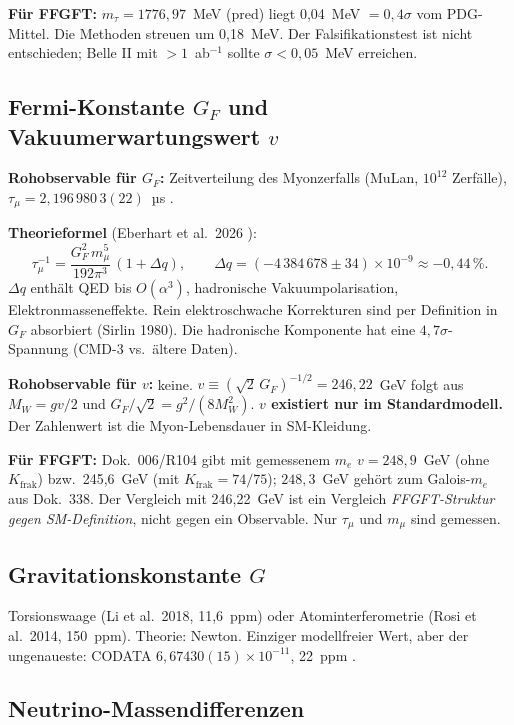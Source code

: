 \textbf{Für FFGFT:} $m_\tau=1776{,}97$~MeV (pred) liegt 0{,}04~MeV $=0{,}4\sigma$ vom PDG-Mittel. Die Methoden streuen um 0{,}18~MeV. Der Falsifikationstest ist nicht entschieden; Belle II mit $>1$~ab$^{-1}$ sollte $\sigma<0{,}05$~MeV erreichen.

\subsection{Fermi-Konstante $G_F$ und Vakuumerwartungswert $v$}

\textbf{Rohobservable für $G_F$:} Zeitverteilung des Myonzerfalls (MuLan, $10^{12}$ Zerfälle), $\tau_\mu=2{,}196\,980\,3(22)$~µs \QM.

\textbf{Theorieformel} (Eberhart et al.\ 2026 \QM):
\begin{equation}
\tau_\mu^{-1}=\frac{G_F^2\,m_\mu^5}{192\pi^3}\,(1+\Delta q),\qquad \Delta q=(-4\,384\,678\pm34)\times10^{-9}\approx-0{,}44\,\%.
\end{equation}
$\Delta q$ enthält QED bis $O(\alpha^3)$, hadronische Vakuumpolarisation, Elektronmasseneffekte. Rein elektroschwache Korrekturen sind per Definition in $G_F$ absorbiert (Sirlin 1980). Die hadronische Komponente hat eine $4{,}7\sigma$-Spannung (CMD-3 vs.\ ältere Daten).

\textbf{Rohobservable für $v$:} keine. $v\equiv(\sqrt2\,G_F)^{-1/2}=246{,}22$~GeV folgt aus $M_W=gv/2$ und $G_F/\sqrt2=g^2/(8M_W^2)$. \textbf{$v$ existiert nur im Standardmodell.} Der Zahlenwert ist die Myon-Lebensdauer in SM-Kleidung.

\textbf{Für FFGFT:} Dok.~006/R104 gibt mit gemessenem $m_e$ $v=248{,}9$~GeV (ohne $K_\text{frak}$) bzw.\ 245{,}6~GeV (mit $K_\text{frak}=74/75$); $248{,}3$~GeV gehört zum Galois-$m_e$ aus Dok.~338. Der Vergleich mit 246{,}22~GeV ist ein Vergleich \emph{FFGFT-Struktur gegen SM-Definition}, nicht gegen ein Observable. Nur $\tau_\mu$ und $m_\mu$ sind gemessen.

\subsection{Gravitationskonstante $G$}

Torsionswaage (Li et al.\ 2018, 11{,}6~ppm) oder Atominterferometrie (Rosi et al.\ 2014, 150~ppm). Theorie: Newton. Einziger modellfreier Wert, aber der ungenaueste: CODATA $6{,}67430(15)\times10^{-11}$, 22~ppm \QM.

\subsection{Neutrino-Massendifferenzen}

